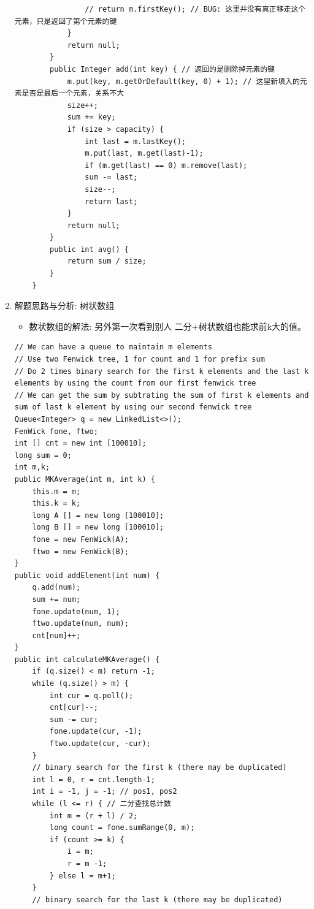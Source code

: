 \documentclass[9pt, b5paaper]{book}
\begin{document}
\begin{enumerate}
\begin{verbatim}
                // return m.firstKey(); // BUG: 这里并没有真正移走这个元素，只是返回了第个元素的键
            }
            return null;
        }
        public Integer add(int key) { // 返回的是删除掉元素的键
            m.put(key, m.getOrDefault(key, 0) + 1); // 这里新填入的元素是否是最后一个元素，关系不大
            size++;
            sum += key;
            if (size > capacity) {
                int last = m.lastKey();
                m.put(last, m.get(last)-1);
                if (m.get(last) == 0) m.remove(last);
                sum -= last;
                size--;
                return last;
            }
            return null;
        }
        public int avg() {
            return sum / size;
        }
    }
\end{verbatim}
\item 解题思路与分析: 树状数组
\label{sec-1-1-3-2}
\begin{itemize}
\item 数状数组的解法: 另外第一次看到别人 二分+树状数组也能求前k大的值。
\end{itemize}
\begin{verbatim}
// We can have a queue to maintain m elements
// Use two Fenwick tree, 1 for count and 1 for prefix sum
// Do 2 times binary search for the first k elements and the last k elements by using the count from our first fenwick tree
// We can get the sum by subtrating the sum of first k elements and sum of last k element by using our second fenwick tree
Queue<Integer> q = new LinkedList<>();
FenWick fone, ftwo;
int [] cnt = new int [100010];
long sum = 0;
int m,k;
public MKAverage(int m, int k) {
    this.m = m;
    this.k = k;
    long A [] = new long [100010];
    long B [] = new long [100010];
    fone = new FenWick(A);
    ftwo = new FenWick(B);
}
public void addElement(int num) {
    q.add(num);
    sum += num;
    fone.update(num, 1);
    ftwo.update(num, num);
    cnt[num]++;
}
public int calculateMKAverage() {
    if (q.size() < m) return -1;
    while (q.size() > m) {
        int cur = q.poll();
        cnt[cur]--;
        sum -= cur;
        fone.update(cur, -1);
        ftwo.update(cur, -cur);
    }
    // binary search for the first k (there may be duplicated)
    int l = 0, r = cnt.length-1;
    int i = -1, j = -1; // pos1, pos2 
    while (l <= r) { // 二分查找总计数
        int m = (r + l) / 2;
        long count = fone.sumRange(0, m);
        if (count >= k) {
            i = m;
            r = m -1;
        } else l = m+1;
    }
    // binary search for the last k (there may be duplicated)

\end{verbatim}
\end{enumerate}
\end{document}
